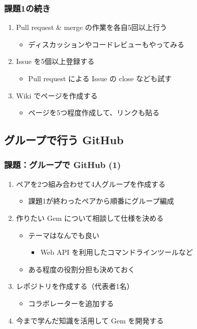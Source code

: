 \documentclass[a4paper,twoside,twocolumn]{bxjsarticle}
\begin{document}
\subsubsection{課題1の続き}
\label{sec-4-1-2}
\begin{enumerate}
\item Pull request \& merge の作業を各自5回以上行う
\begin{itemize}
\item ディスカッションやコードレビューもやってみる
\end{itemize}
\item Issue を5個以上登録する
\begin{itemize}
\item Pull request による Issue の close なども試す
\end{itemize}
\item Wiki でページを作成する
\begin{itemize}
\item ページを5つ程度作成して、リンクも貼る
\end{itemize}
\end{enumerate}

\subsection{グループで行う GitHub}
\label{sec-4-2}
\subsubsection{課題：グループで GitHub (1)}
\label{sec-4-2-1}
\begin{enumerate}
\item ペアを2つ組み合わせて4人グループを作成する
\begin{itemize}
\item 課題1が終わったペアから順番にグループ編成
\end{itemize}
\item 作りたい Gem について相談して仕様を決める
\begin{itemize}
\item テーマはなんでも良い
\begin{itemize}
\item Web API を利用したコマンドラインツールなど
\end{itemize}
\item ある程度の役割分担も決めておく
\end{itemize}
\item レポジトリを作成する（代表者1名）
\begin{itemize}
\item コラボレーターを追加する
\end{itemize}
\item 今まで学んだ知識を活用して Gem を開発する
\end{enumerate}
\end{document}
